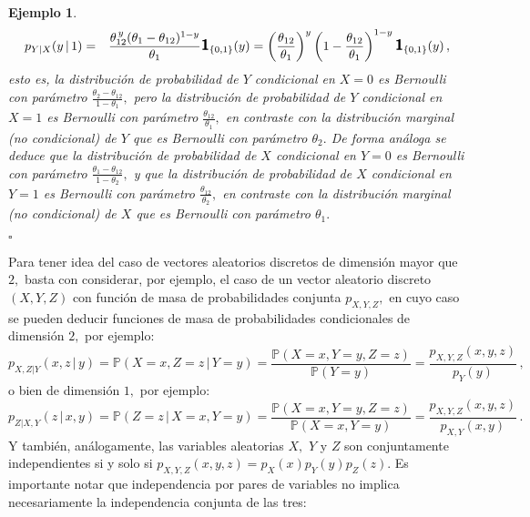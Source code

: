 \documentclass[spanish,10pt,letterpaper]{article}
\newtheorem{ejem}{Ejemplo}
\newcommand{\prob}{\mathbb{P}}
\newcommand{\indic}{\textbf{\textsf{\large{1}}}}
\newcommand{\qed}{\begin{flushright}$\square$\end{flushright}}
\begin{document}
\begin{ejem}
\begin{eqnarray*}
        p_{Y|X}(y\,|\,1) &=& \frac{\theta_{12}^{\,y}(\theta_1-\theta_{12})^{1-y}}{\theta_1}\indic_{\{0,1\}}(y) = \left(\frac{\theta_{12}}{\theta_1}\right)^y\left(1 - \frac{\theta_{12}}{\theta_1}\right)^{1-y}\indic_{\{0,1\}}(y)\,,
    \end{eqnarray*}
    esto es, la distribución de probabilidad de $Y$ condicional en $X=0$ es Bernoulli con parámetro $\frac{\theta_2-\theta_{12}}{1-\theta_1},$ pero la distribución de probabilidad de $Y$ condicional en $X=1$ es Bernoulli con parámetro $\frac{\theta_{12}}{\theta_1},$ en contraste con la distribución marginal (no condicional) de $Y$ que es Bernoulli con parámetro $\theta_2.$ De forma análoga se deduce que la distribución de probabilidad de $X$ condicional en $Y=0$ es Bernoulli con parámetro $\frac{\theta_1-\theta_{12}}{1-\theta_2},$ y que la distribución de probabilidad de $X$ condicional en $Y=1$ es Bernoulli con parámetro $\frac{\theta_{12}}{\theta_2},$ en contraste con la distribución marginal (no condicional) de $X$ que es Bernoulli con parámetro $\theta_1.$ \qed 
\end{ejem}

Para tener idea del caso de vectores aleatorios discretos de dimensión mayor que $2,$ basta con considerar, por ejemplo, el caso de un vector aleatorio discreto $(X,Y,Z)$ con función de masa de probabilidades conjunta $p_{X,Y,Z},$ en cuyo caso se pueden deducir funciones de masa de probabilidades condicionales de dimensión $2,$ por ejemplo:
$$p_{X,Z|Y}(x,z\,|\,y) = \prob(X=x,Z=z\,|\,Y=y) = \frac{\prob(X=x,Y=y,Z=z)}{\prob(Y=y)} = \frac{p_{X,Y,Z}(x,y,z)}{p_Y(y)}\,,$$
o bien de dimensión $1,$ por ejemplo:
$$p_{Z|X,Y}(z\,|\,x,y) = \prob(Z=z\,|\,X=x,Y=y) = \frac{\prob(X=x,Y=y,Z=z)}{\prob(X=x,Y=y)} = \frac{p_{X,Y,Z}(x,y,z)}{p_{X,Y}(x,y)}\,.$$ Y también, análogamente, las variables aleatorias $X,$ $Y$ y $Z$ son conjuntamente independientes si y solo si \linebreak $p_{X,Y,Z}(x,y,z)=p_X(x)p_Y(y)p_Z(z).$ Es importante notar que independencia por pares de variables no implica necesariamente la independencia conjunta de las tres: 

\bigskip 
\end{document}
